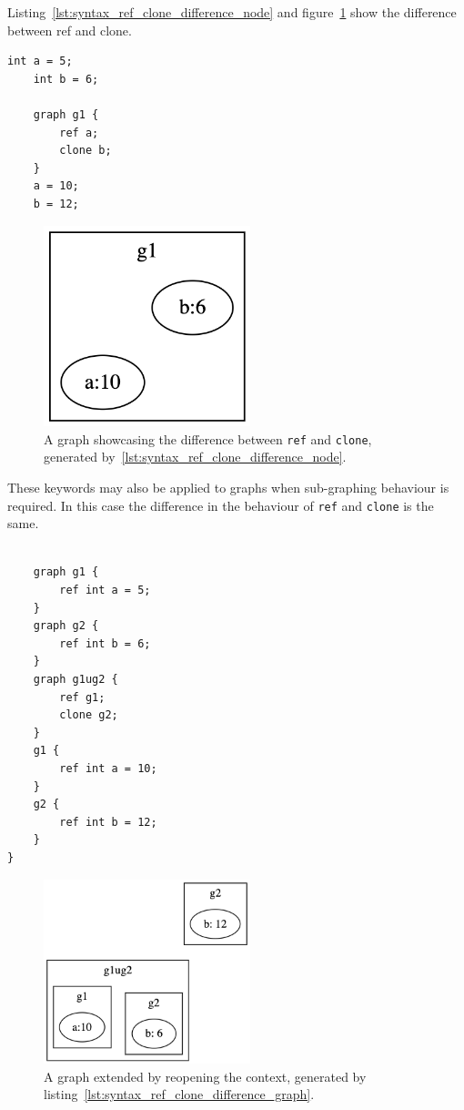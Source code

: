 Listing~\ref{lst:syntax_ref_clone_difference_node} and figure~\ref{fig:syntax_ref_vs_clone} show the difference between ref and clone.

\begin{lstlisting}[caption={Example code, showcasing the difference between ref and clone.},captionpos=b,label={lst:syntax_ref_clone_difference_node}]
    int a = 5;
    int b = 6;

    graph g1 {
        ref a;
        clone b;
    }
    a = 10;
    b = 12;
\end{lstlisting}
\begin{figure}[H]
    \centering
    \includegraphics[width=6cm]{figures/syntax_section/syntax_ref_vs_clone}
    \caption{A graph showcasing the difference between \lstinline{ref} and \lstinline{clone}, generated by~\ref{lst:syntax_ref_clone_difference_node}.}
    \label{fig:syntax_ref_vs_clone}
\end{figure}

These keywords may also be applied to graphs when sub-graphing behaviour is required.
In this case the difference in the behaviour of \lstinline{ref} and \lstinline{clone} is the same.

\begin{lstlisting}[caption={Ref and clone with graphs.},captionpos=b, label={lst:syntax_ref_clone_difference_graph}]

    graph g1 {
        ref int a = 5;
    }
    graph g2 {
        ref int b = 6;
    }
    graph g1ug2 {
        ref g1;
        clone g2;
    }
    g1 {
        ref int a = 10;
    }
    g2 {
        ref int b = 12;
    }
}
\end{lstlisting}
\begin{figure}[H]
    \centering
    \includegraphics[width=6cm]{figures/syntax_section/syntax_ref_vs_clone_graphs}
    \caption{A graph extended by reopening the context, generated by listing~\ref{lst:syntax_ref_clone_difference_graph}.}
    \label{fig:syntax_ref_vs_clone_with_graphs}
\end{figure}

